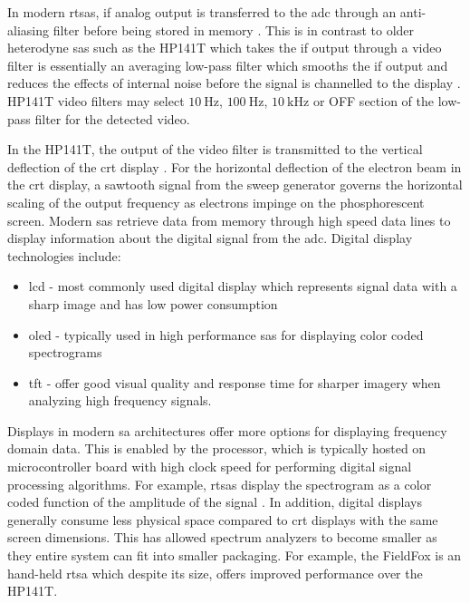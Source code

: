 \documentclass[class=report,11pt,crop=false]{standalone}
\begin{document}
	In modern \acrshort{rtsa}s, \acrshort{if} analog output is transferred to the \acrshort{adc} through an anti-aliasing filter before being stored in memory \cite{tektronixRSA2208A}. This is in contrast to older heterodyne \acrshort{sa}s such as the HP141T which takes the \acrshort{if} output through a video filter is essentially an averaging low-pass filter which smooths the \acrshort{if} output and reduces the effects of internal noise before the signal is channelled to the display \cite{rauscher2007}. HP141T video filters may select $\SI{10}{\hertz}$, $\SI{100}{\hertz}$, $\SI{10}{\kilo\hertz}$ or OFF section of the low-pass filter for the detected video. 
	
	In the HP141T, the output of the video filter is transmitted to the vertical deflection of the \acrshort{crt} display \cite{HPsiganalyzers}. For the horizontal deflection of the electron beam in the \acrshort{crt} display, a sawtooth signal from the sweep generator governs the horizontal scaling of the output frequency as electrons impinge on the phosphorescent screen. Modern \acrshort{sa}s retrieve data from memory through high speed data lines to display information about the digital signal from the \acrshort{adc}. Digital display technologies include:
	
	\begin{itemize}
		\item 
		\acrshort{lcd} - most commonly used digital display which represents signal data with a sharp image and has low power consumption
		\item 
		\acrshort{oled} - typically used in high performance \acrshort{sa}s for displaying color coded spectrograms
		\item 
		\acrshort{tft} - offer good visual quality and response time for sharper imagery when analyzing high frequency signals.
	\end{itemize}

	Displays in modern \acrshort{sa} architectures offer more options for displaying frequency domain data. This is enabled by the processor, which is typically hosted on microcontroller board with high clock speed for performing digital signal processing algorithms. For example, \acrshort{rtsa}s display the spectrogram as a color coded function of the amplitude of the signal \cite{al2013}. In addition, digital displays generally consume less physical space compared to \acrshort{crt} displays with the same screen dimensions. This has allowed spectrum analyzers to become smaller as they entire system can fit into smaller packaging. For example, the FieldFox is an hand-held \acrshort{rtsa} which despite its size, offers improved performance over the HP141T.
	
\end{document}

